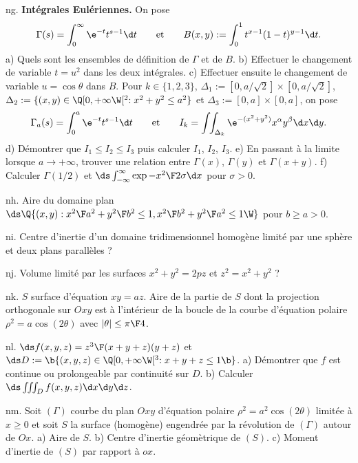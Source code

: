 \exo [Level=2,Fight=2,Learn=2,Type=\Exercices,Field=\FonctionsDéfiniesParUneIntégrale,Origin=] ng. 
{\bf Intégrales Eulériennes. }On pose 
$$
\Gamma(s)=\int_0^{\infty}\e^{-t}t^{s-1}\d t\qquad\hbox{et}\qquad B(x,y):=\int_0^1t^{x-1}(1-t)^{y-1}\d t.
$$
a) Quels sont les ensembles de définition de $\Gamma$ et de $B$. \pn
b) Effectuer le changement de variable $t=u^2$ dans les deux intégrales. \pn
c) Effectuer ensuite le changement de variable $u=\cos \theta$ dans $B$. \pn
Pour $k\in\{1,2,3\}$, $\Delta_1:=[0,a/\sqrt2]\times[0,a/\sqrt2]$, 
$\Delta_2:=\{(x,y)\in\Q[0,+\infty\W[^2:x^2+y^2\le a^2\}$ et $\Delta_3:=[0,a]\times[0,a]$, 
on pose 
$$
\Gamma_a(s)=\int_0^a\e^{-t}t^{s-1}\d t\qquad\hbox{et}\qquad 
I_k=\int\!\!\int_{\Delta_k}\e^{-(x^2+y^2)}x^\alpha y^\beta\d x\d y.
$$  
d) Démontrer que $I_1\le I_2\le I_3$ puis calculer $I_1$, $I_2$, $I_3$. \pn
e) En passant à la limite lorsque $a\to+\infty$, trouver une relation 
entre $\Gamma(x)$, $\Gamma(y)$ et $\Gamma(x+y)$. \pn
f) Calculer $\Gamma(1/2)$ et $\ds\int_{-\infty}^\infty\exp-{x^2\F2\sigma}\d x$ pour $\sigma>0$. 

\exo [Level=2,Fight=1,Learn=1,Type=\Exercices,Field=\Aires,Origin=] nh. 
Aire du domaine plan 
$\ds\Q\{(x,y):{x^2\F a^2}+{y^2\F b^2}\le 1, {x^2\F b^2}+{y^2\F a^2}\le 1\W\}$ pour $b\ge a>0$. 

\exo [Level=2,Fight=1,Learn=1,Type=\Exercices,Field=\IntégralesMultiples,Origin=] ni. 
Centre d'inertie d'un domaine tridimensionnel homogène limité par une sphère et deux plans parallèles ? 

\exo [Level=2,Fight=1,Learn=1,Type=\Exercices,Field=\Volumes,Origin=] nj. 
Volume limité par les surfaces $x^2+y^2=2pz$ et $z^2=x^2+y^2$ ? 

\exo [Level=2,Fight=1,Learn=1,Type=\Exercices,Field=\Aires,Origin=] nk. 
$S$ surface d'équation $xy=az$. Aire de la partie de $S$ dont 
la projection orthogonale sur $Oxy$ est à l'intérieur de la boucle de la courbe d'équation 
polaire $\rho^2=a\cos(2\theta)$ avec $|\theta|\le{\pi\F4}$. 

\exo [Level=2,Fight=1,Learn=1,Type=\Exercices,Field=\IntégralesMultiples,Origin=] nl. 
$\ds f(x,y,z)={z^3\F(x+y+z)(y+z)}$ et $\ds D:=\b\{(x,y,z)\in\Q[0,+\infty\W[^3:x+y+z\le1\b \}$. \pn
a) Démontrer que $f$ est continue ou prolongeable par continuité sur $D$. \pn
b) Calculer $\ds \int\!\!\int\!\!\int_Df(x,y,z)\d x\d y\d z$. 

\exo [Level=2,Fight=1,Learn=1,Type=\Exercices,Field=\IntégralesMultiples,Origin=] nm. 
Soit $(\Gamma)$ courbe du plan $Oxy$ d'équation polaire $\rho^2=a^2\cos(2\theta)$ 
limitée à $x\ge0$ et soit $S$ la surface (homogène) engendrée par la révolution de $(\Gamma)$ autour de $Ox$. \pn
a) Aire de $S$. \pn
b) Centre d'inertie géomètrique de $(S)$. \pn
c) Moment d'inertie de $(S)$ par rapport à $ox$. 

